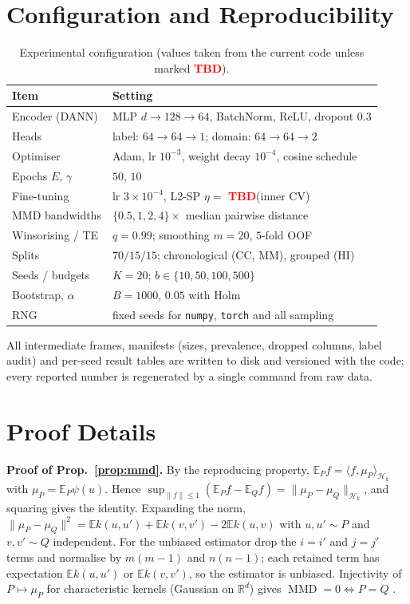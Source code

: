 \documentclass[journal]{IEEEtran}
\newcommand{\TBD}{\textcolor{red}{\textbf{TBD}}}
\newcommand{\R}{\mathbb{R}}
\newcommand{\E}{\mathbb{E}}
\newcommand{\1}{\mathbf{1}}
\DeclareMathOperator{\MMD}{MMD}
\begin{document}
\section{Configuration and Reproducibility}\label{app:config}
\begin{table}[h]
\centering
\caption{Experimental configuration (values taken from the current code unless marked \TBD).}
\label{tab:config}
\scriptsize
\begin{tabular}{@{}ll@{}}
\toprule
Item & Setting \\
\midrule
Encoder (DANN) & MLP $d\!\to\!128\!\to\!64$, BatchNorm, ReLU, dropout $0.3$ \\
Heads & label: $64\!\to\!64\!\to\!1$; domain: $64\!\to\!64\!\to\!2$ \\
Optimiser & Adam, lr $10^{-3}$, weight decay $10^{-4}$, cosine schedule \\
Epochs $E$, $\gamma$ & $50$, $10$ \\
Fine-tuning & lr $3\!\times\!10^{-4}$, L2-SP $\eta=$ \TBD (inner CV) \\
MMD bandwidths & $\{0.5,1,2,4\}\times$ median pairwise distance \\
Winsorising / TE & $q=0.99$; smoothing $m=20$, $5$-fold OOF \\
Splits & $70/15/15$; chronological (CC, MM), grouped (HI) \\
Seeds / budgets & $K=20$; $b\in\{10,50,100,500\}$ \\
Bootstrap, $\alpha$ & $B=1000$, $0.05$ with Holm \\
RNG & fixed seeds for \texttt{numpy}, \texttt{torch} and all sampling \\
\bottomrule
\end{tabular}
\end{table}
All intermediate frames, manifests (sizes, prevalence, dropped columns, label audit) and per-seed result tables are written to disk and versioned with the code; every reported number is regenerated by a single command from raw data.

\section{Proof Details}\label{app:proofs}
\textbf{Proof of Prop.~\ref{prop:mmd}.} By the reproducing property, $\E_Pf=\langle f,\mu_P\rangle_{\mathcal H_k}$ with $\mu_P=\E_P\psi(u)$. Hence $\sup_{\|f\|\le1}(\E_Pf-\E_Qf)=\|\mu_P-\mu_Q\|_{\mathcal H_k}$, and squaring gives the identity. Expanding the norm, $\|\mu_P-\mu_Q\|^2=\E k(u,u')+\E k(v,v')-2\E k(u,v)$ with $u,u'\sim P$ and $v,v'\sim Q$ independent. For the unbiased estimator drop the $i=i'$ and $j=j'$ terms and normalise by $m(m-1)$ and $n(n-1)$; each retained term has expectation $\E k(u,u')$ or $\E k(v,v')$, so the estimator is unbiased. Injectivity of $P\mapsto\mu_P$ for characteristic kernels (Gaussian on $\R^d$) gives $\MMD=0\iff P=Q$ \cite{gretton2012kernel}.
\end{document}
